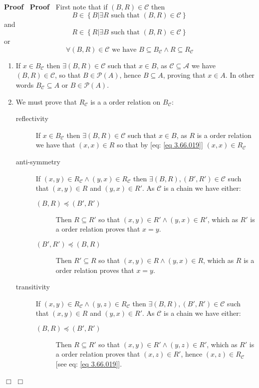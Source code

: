 \documentclass{book}
\newenvironment{proof}{\noindent\textbf{Proof\ }}{\hspace*{\fill}$\Box$\medskip}
\begin{document}
\begin{proof}
  \begin{proof}
    First note that if $(B, R) \in \mathcal{C}$ then
    \[ B \in \left\{ B| \exists R \text{ such that } (B, R) \in \mathcal{C}
       \right\} \]
    and
    \[ R \in \left\{ R| \exists B \text{ such that } (B, R) \in \mathcal{C}
       \right\} \]
    or
    \begin{equation}
      \label{eq 3.66.019} \forall (B, R) \in \mathcal{C} \text{ we have } B
      \subseteq B_{\mathcal{C}} \wedge R \subseteq R_{\mathcal{C}}
    \end{equation}
    \begin{enumerate}
      \item If $x \in B_{\mathcal{C}}$ then $\exists (B, R) \in \mathcal{C}$
      such that $x \in B$, as $\mathcal{C} \subseteq \mathcal{A}$ we have $(B,
      R) \in \mathcal{C}$, so that $B \in \mathcal{P} (A)$, hence $B \subseteq
      A$, proving that $x \in A$. In other words $B_{\mathcal{C}} \subseteq A$
      or $B \in \mathcal{P} (A)$.
      
      \item We must prove that $R_{\mathcal{C}}$ is a a order relation on
      $B_{\mathcal{C}}$:
      \begin{description}
        \item[reflectivity] If $x \in B_{\mathcal{C}}$ then $\exists (B, R)
        \in \mathcal{C}$ such that $x \in B$, as $R$ is a order relation we
        have that $(x, x) \in R$ so that by [eq: \ref{eq 3.66.019}] $(x, x)
        \in R_{\mathcal{C}}$
        
        \item[anti-symmetry] If $(x, y) \in R_{\mathcal{C}} \wedge (y, x) \in
        R_{\mathcal{C}}$ then $\exists (B, R), (B', R') \in \mathcal{C}$ such
        that $(x, y) \in R$ and $(y, x) \in R'$. As $\mathcal{C}$ is a chain
        we have either:
        \begin{description}
          \item[$(B, R) \preccurlyeq (B', R')$] Then $R \subseteq R'$ so that
          $(x, y) \in R' \wedge (y, x) \in R'$, which as $R'$ is a order
          relation proves that $x = y$.
          
          \item[$(B', R') \preccurlyeq (B, R)$] Then $R' \subseteq R$ so that
          $(x, y) \in R \wedge (y, x) \in R$, which as $R$ is a order relation
          proves that $x = y$.
        \end{description}
        \item[transitivity] If $(x, y) \in R_{\mathcal{C}} \wedge (y, z) \in
        R_{\mathcal{C}}$ then $\exists (B, R), (B', R') \in \mathcal{C}$ such
        that $(x, y) \in R$ and $(y, x) \in R'$. As $\mathcal{C}$ is a chain
        we have either:
        \begin{description}
          \item[$(B, R) \preccurlyeq (B', R')$] Then $R \subseteq R'$ so that
          $(x, y) \in R' \wedge (y, z) \in R'$, which as $R'$ is a order
          relation proves that $(x, z) \in R'$, hence $(x, z) \in
          R_{\mathcal{C}}$ [see eq: \ref{eq 3.66.019}].
          

\end{description}
\end{description}
\end{enumerate}
\end{proof}
\end{proof}
\end{document}
